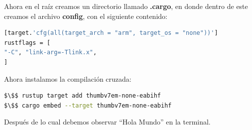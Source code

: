 Ahora en el raíz creamos un directorio llamado \textbf{.cargo}, en donde dentro de este creamos el archivo \textbf{config}, con el siguiente contenido:

\begin{lstlisting}[language=bash]
[target.'cfg(all(target_arch = "arm", target_os = "none"))']
rustflags = [
"-C", "link-arg=-Tlink.x",
]
\end{lstlisting}

Ahora instalamos la compilación cruzada:

\begin{lstlisting}[language=bash]
$\$$ rustup target add thumbv7em-none-eabihf
$\$$ cargo embed --target thumbv7em-none-eabihf
\end{lstlisting}

Después de lo cual debemos observar ``Hola Mundo'' en la terminal.